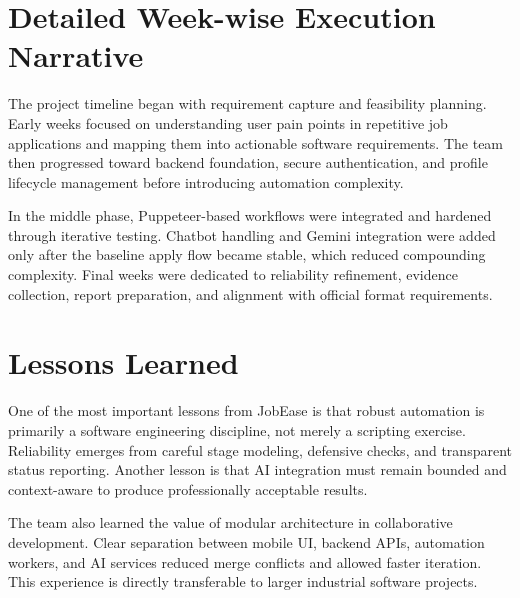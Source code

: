 \documentclass[12pt,a4paper,oneside]{report}
\begin{document}
\section{Detailed Week-wise Execution Narrative}
The project timeline began with requirement capture and feasibility planning. Early weeks focused on understanding user pain points in repetitive job applications and mapping them into actionable software requirements. The team then progressed toward backend foundation, secure authentication, and profile lifecycle management before introducing automation complexity.

In the middle phase, Puppeteer-based workflows were integrated and hardened through iterative testing. Chatbot handling and Gemini integration were added only after the baseline apply flow became stable, which reduced compounding complexity. Final weeks were dedicated to reliability refinement, evidence collection, report preparation, and alignment with official format requirements.

\section{Lessons Learned}
One of the most important lessons from JobEase is that robust automation is primarily a software engineering discipline, not merely a scripting exercise. Reliability emerges from careful stage modeling, defensive checks, and transparent status reporting. Another lesson is that AI integration must remain bounded and context-aware to produce professionally acceptable results.

The team also learned the value of modular architecture in collaborative development. Clear separation between mobile UI, backend APIs, automation workers, and AI services reduced merge conflicts and allowed faster iteration. This experience is directly transferable to larger industrial software projects.
\end{document}
